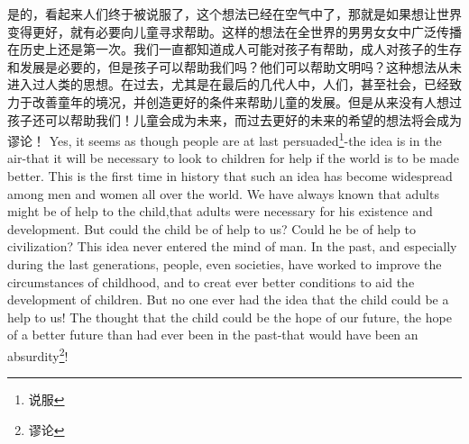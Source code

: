 \documentclass[lang=cn,10pt]{elegantbook}
\begin{document}
\begin{tcolorbox}[title=译文,
colback=red!5!white,
colframe=red!75!black,
fonttitle=\bfseries]
是的，看起来人们终于被说服了，这个想法已经在空气中了，那就是如果想让世界变得更好，就有必要向儿童寻求帮助。这样的想法在全世界的男男女女中广泛传播在历史上还是第一次。我们一直都知道成人可能对孩子有帮助，成人对孩子的生存和发展是必要的，但是孩子可以帮助我们吗？他们可以帮助文明吗？这种想法从未进入过人类的思想。在过去，尤其是在最后的几代人中，人们，甚至社会，已经致力于改善童年的境况，并创造更好的条件来帮助儿童的发展。但是从来没有人想过孩子还可以帮助我们！儿童会成为未来，而过去更好的未来的希望的想法将会成为谬论！
Yes, it seems as though people are at last persuaded\footnote{说服}-the idea is in the air-that it will be necessary to look to children for help if the world is to be made better. This is the first time in history that such an idea has become widespread among men and women all over the world. We have always known that adults might be of help to the child,that adults were necessary for his existence and development. But could the child be of help to us? Could he be of help to civilization? This idea never entered the mind of man. In the past, and especially during the last generations, people, even societies, have worked to improve the circumstances of childhood, and to creat ever better conditions to aid the development of children. But no one ever had the idea that the child could be a help to us! The thought that the child could be the hope of our future, the hope of a better future than had ever been in the past-that would have been an absurdity\footnote{谬论}!
\end{tcolorbox}
\end{document}
